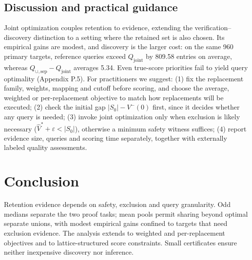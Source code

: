 \documentclass[11pt]{article}
\newcommand{\Qj}{Q_{\mathrm{joint}}}
\newcommand{\Qu}{Q_{\cup,\mathrm{sep}}}
\newcommand{\Sz}{S_0}
\begin{document}
\subsection{Discussion and practical guidance}
Joint optimization couples retention to evidence, extending the verification--discovery distinction \citep{charikar2002priced,diwan2026matroid} to a setting where the retained set is also chosen. Its empirical gains are modest, and discovery is the larger cost: on the same 960 primary targets, reference queries exceed $\Qj$ by 809.58 entries on average, whereas $\Qu-\Qj$ averages 5.34. Even true-score priorities fail to yield query optimality (Appendix P.5). For practitioners we suggest: (1) fix the replacement family, weights, mapping and cutoff before scoring, and choose the average, weighted or per-replacement objective to match how replacements will be executed; (2) check the initial gap $|\Sz|-V^-(0)$ first, since it decides whether any query is needed; (3) invoke joint optimization only when exclusion is likely necessary ($\hat V^*+\varepsilon<|\Sz|$), otherwise a minimum safety witness suffices; (4) report evidence size, queries and scoring time separately, together with externally labeled quality assessments.

\section{Conclusion}
Retention evidence depends on safety, exclusion and query granularity. Odd medians separate the two proof tasks; mean pools permit sharing beyond optimal separate unions, with modest empirical gains confined to targets that need exclusion evidence. The analysis extends to weighted and per-replacement objectives and to lattice-structured score constraints. Small certificates ensure neither inexpensive discovery nor inference.
\end{document}
